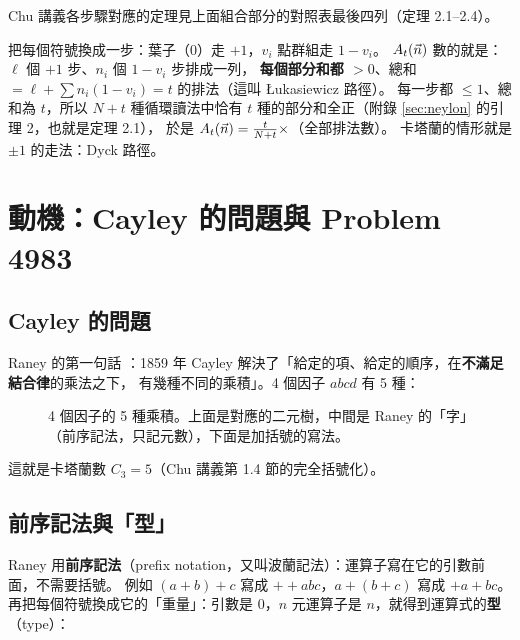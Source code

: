 \begin{table}[H]
\centering\small
\RanLadder
\caption{推廣的階梯。$N=\ip{\vn}{\vv}=\sum n_iv_i$，字串長度 $m=N+t$；四個公式都是定理 2.2 的 $\RL{n}{a}=\frac nm M$ 換記號。
例子欄的個數由 \texttt{make\_figs.py} 窮舉核對。}
\label{tab:ladder}
\end{table}

Chu 講義各步驟對應的定理見上面組合部分的對照表最後四列（定理 2.1--2.4）。

\begin{notebox}
把每個符號換成一步：葉子（0）走 $+1$，$v_i$ 點群組走 $1-v_i$。
$A_t(\vec n)$ 數的就是：$\ell$ 個 $+1$ 步、$n_i$ 個 $1-v_i$ 步排成一列，
\textbf{每個部分和都 $>0$}、總和 $=\ell+\sum n_i(1-v_i)=t$ 的排法（這叫 Łukasiewicz 路徑）。
每一步都 $\le1$、總和為 $t$，所以 $N+t$ 種循環讀法中恰有 $t$ 種的部分和全正（附錄 \ref{sec:neylon} 的引理 2，也就是定理 2.1），
於是 $A_t(\vec n)=\frac{t}{N+t}\times$（全部排法數）。
卡塔蘭的情形就是 $\pm1$ 的走法：Dyck 路徑。
\end{notebox}

\section{動機：Cayley 的問題與 Problem 4983}\label{sec:motive}

\subsection{Cayley 的問題}

Raney 的第一句話 ：1859 年 Cayley 解決了「給定的項、給定的順序，在\textbf{不滿足結合律}的乘法之下，
有幾種不同的乘積」。4 個因子 $abcd$ 有 5 種：

\begin{figure}[H]
\centering
\RanCayley
\caption{4 個因子的 5 種乘積。上面是對應的二元樹，中間是 Raney 的「字」（前序記法，只記元數），下面是加括號的寫法。}
\label{fig:cayley}
\end{figure}

這就是卡塔蘭數 $C_3=5$（Chu 講義第 1.4 節的完全括號化）。

\subsection{前序記法與「型」}

Raney 用\textbf{前序記法}（prefix notation，又叫波蘭記法）：運算子寫在它的引數前面，不需要括號。
例如 $(a+b)+c$ 寫成 $++abc$，$a+(b+c)$ 寫成 $+a+bc$。
再把每個符號換成它的「重量」：引數是 $0$，$n$ 元運算子是 $n$，就得到運算式的\textbf{型}（type）：

